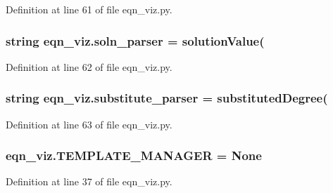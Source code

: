 Definition at line 61 of file eqn\+\_\+viz.\+py.

\hypertarget{namespaceeqn__viz_ab4bb266f8ba35459c0d095bcffadbad4}{}
\subsubsection[{soln\+\_\+parser}]{\setlength{\rightskip}{0pt plus 5cm}string eqn\+\_\+viz.\+soln\+\_\+parser = \textquotesingle{}solution\+Value(\textquotesingle{}}\label{namespaceeqn__viz_ab4bb266f8ba35459c0d095bcffadbad4}


Definition at line 62 of file eqn\+\_\+viz.\+py.

\hypertarget{namespaceeqn__viz_aacd332e3c02218eb9ae4ec66a3e31fd0}{}
\subsubsection[{substitute\+\_\+parser}]{\setlength{\rightskip}{0pt plus 5cm}string eqn\+\_\+viz.\+substitute\+\_\+parser = \textquotesingle{}substituted\+Degree(\textquotesingle{}}\label{namespaceeqn__viz_aacd332e3c02218eb9ae4ec66a3e31fd0}


Definition at line 63 of file eqn\+\_\+viz.\+py.

\hypertarget{namespaceeqn__viz_af2da9273cfc3d8dc9ce1f05558cbc838}{}
\subsubsection[{T\+E\+M\+P\+L\+A\+T\+E\+\_\+\+M\+A\+N\+A\+G\+E\+R}]{\setlength{\rightskip}{0pt plus 5cm}eqn\+\_\+viz.\+T\+E\+M\+P\+L\+A\+T\+E\+\_\+\+M\+A\+N\+A\+G\+E\+R = None}\label{namespaceeqn__viz_af2da9273cfc3d8dc9ce1f05558cbc838}


Definition at line 37 of file eqn\+\_\+viz.\+py.

\hypertarget{namespaceeqn__viz_a7bf2f0fb75b2d7a493e3ebf9cf2f580e}{}
